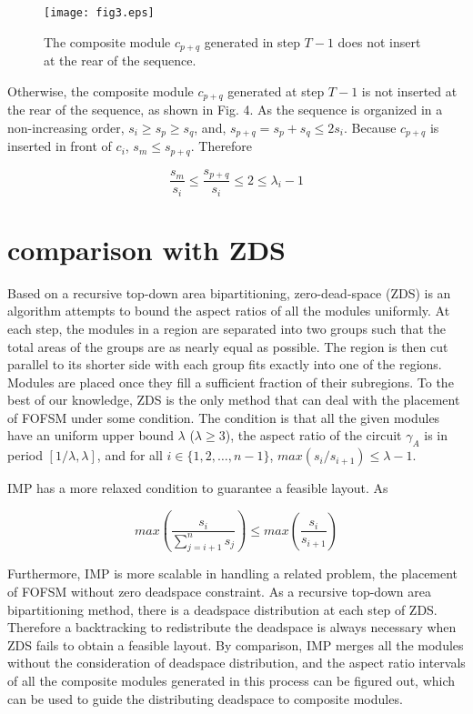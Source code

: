 \documentclass[conference]{IEEEtran}
\begin{document}
\begin{IEEEproof}
\begin{figure}[!t]
\centering
\texttt{[image: fig3.eps]}
\caption{The composite module $c_{p+q}$ generated in step $T-1$ does not insert at the rear of the sequence.}
\label{fig_sim}
\end{figure}


Otherwise, the composite module $c_{p+q}$ generated at step $T-1$ is not inserted at the rear of the sequence, as shown in Fig. 4. As the sequence is organized in a non-increasing order, $s_i \ge s_p \ge s_q$, and, $s_{p+q}=s_p+s_q \le 2s_i$. Because $c_{p+q}$ is inserted in front of $c_i$, $s_m \le s_{p+q}$. Therefore

$$ \frac{s_m}{s_i} \le \frac{s_{p+q}}{s_i} \le 2 \le \lambda_i-1 $$




\end{IEEEproof}

\section{comparison with ZDS}

Based on a recursive top-down area bipartitioning, zero-dead-space (ZDS) \cite{ZDS} is an algorithm attempts to bound the aspect ratios of all the modules uniformly. At each step, the modules in a region are separated into two groups such that the total areas of the groups are as nearly equal as possible. The region is then cut parallel to its shorter side with each group fits exactly into one of the regions. Modules are placed once they fill a sufficient fraction of their subregions. To the best of our knowledge, ZDS is the only method that can deal with the placement of FOFSM under some condition. The condition is that all the given modules have an uniform upper bound $\lambda$ ($\lambda \ge 3$), the aspect ratio of the circuit $\gamma_A$ is in period $[1/\lambda,\lambda]$, and for all $i \in \{1,2, \ldots, n-1 \}$, $max(s_i/s_{i+1}) \le \lambda-1$.

IMP has a more relaxed condition to guarantee a feasible layout. As

$$ max(\frac{s_i}{\sum_{j=i+1}^ns_j}) \le max(\frac{s_i}{s_{i+1}}) $$


Furthermore, IMP is more scalable in handling a related problem, the placement of FOFSM without zero deadspace constraint. As a recursive top-down area bipartitioning method, there is a deadspace distribution at each step of ZDS. Therefore a backtracking to redistribute the deadspace is always necessary when ZDS fails to obtain a feasible layout. By comparison, IMP merges all the modules without the consideration of deadspace distribution, and the aspect ratio intervals of all the composite modules generated in this process can be figured out, which can be used to guide the distributing deadspace to composite modules.
\end{document}
